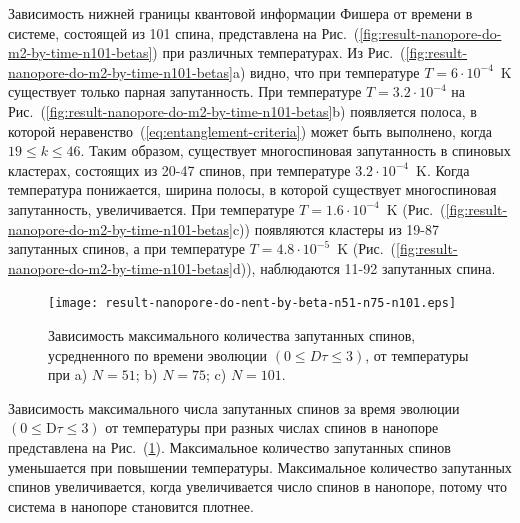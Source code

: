 Зависимость нижней границы квантовой информации Фишера от времени в системе, состоящей из 101 спина, представлена на Рис.~(\ref{fig:result-nanopore-do-m2-by-time-n101-betas}) при различных температурах.
Из Рис.~(\ref{fig:result-nanopore-do-m2-by-time-n101-betas}a) видно, что при температуре $T=6\cdot10^{-4}$~K существует только парная запутанность.
При температуре $T=3.2\cdot10^{-4}$ на Рис.~(\ref{fig:result-nanopore-do-m2-by-time-n101-betas}b) появляется полоса, в которой неравенство~(\ref{eq:entanglement-criteria}) может быть выполнено, когда $19 \leq k \leq 46$.
Таким образом, существует многоспиновая запутанность в спиновых кластерах, состоящих из 20-47 спинов, при температуре $3.2\cdot10^{-4}$~K.
Когда температура понижается, ширина полосы, в которой существует многоспиновая запутанность, увеличивается.
При температуре $T=1.6\cdot10^{-4}$~K (Рис.~(\ref{fig:result-nanopore-do-m2-by-time-n101-betas}c)) появляются кластеры из 19-87 запутанных спинов, а при температуре $T=4.8\cdot10^{-5}$~K (Рис.~(\ref{fig:result-nanopore-do-m2-by-time-n101-betas}d)), наблюдаются 11-92 запутанных спина.

\begin{figure}[H]
 	\texttt{[image: result-nanopore-do-nent-by-beta-n51-n75-n101.eps]}
	\caption{
	  Зависимость максимального количества запутанных спинов,
	  усредненного по времени эволюции $(0 \leq D\tau \leq 3)$,
	  от температуры при  a) $N=51$; b) $N=75$; c) $N=101$.
	}
	\label{fig:result-nanopore-do-nent-by-beta-n51-n75-n101}
\end{figure}

Зависимость максимального числа запутанных спинов за время эволюции $({0}\leq \mathrm{D}\tau\leq{3})$ от температуры при разных числах спинов в нанопоре представлена на Рис.~(\ref{fig:result-nanopore-do-nent-by-beta-n51-n75-n101}).
Максимальное количество запутанных спинов уменьшается при повышении температуры.
Максимальное количество запутанных спинов увеличивается, когда увеличивается число спинов в нанопоре, потому что система в нанопоре становится плотнее.

